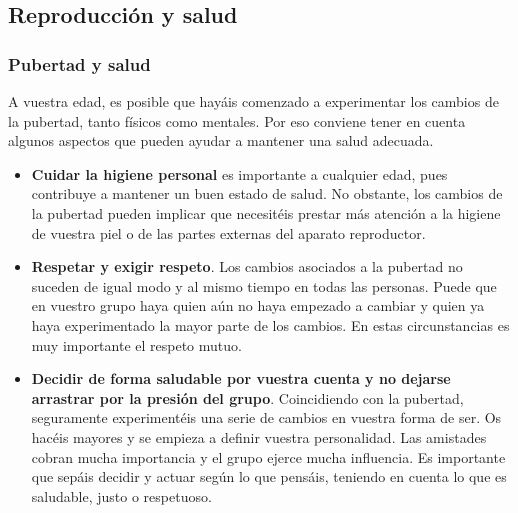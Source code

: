 \subsection{Reproducción y salud}

\subsubsection{Pubertad y salud}

A vuestra edad, es posible que hayáis comenzado a experimentar los cambios de la pubertad, tanto físicos como mentales. Por eso conviene tener en cuenta algunos aspectos que pueden ayudar a mantener una salud adecuada.

\begin{itemize}
    \item \textbf{Cuidar la higiene personal} es importante a cualquier edad, pues contribuye a mantener un buen estado de salud. No obstante, los cambios de la pubertad pueden implicar que necesitéis prestar más atención a la higiene de vuestra piel o de las partes externas del aparato reproductor.
    \item \textbf{Respetar y exigir respeto}. Los cambios asociados a la pubertad no suceden de igual modo y al mismo tiempo en todas las personas. Puede que en vuestro grupo haya quien aún no haya empezado a cambiar y quien ya haya experimentado la mayor parte de los cambios. En estas circunstancias es muy importante el respeto mutuo.
    \item \textbf{Decidir de forma saludable por vuestra cuenta y no dejarse arrastrar por la presión del grupo}. Coincidiendo con la pubertad, seguramente experimentéis una serie de cambios en vuestra forma de ser. Os hacéis mayores y se empieza a definir vuestra personalidad. Las amistades cobran mucha importancia y el grupo ejerce mucha influencia. Es importante que sepáis decidir y actuar según lo que pensáis, teniendo en cuenta lo que es saludable, justo o respetuoso.
\end{itemize}